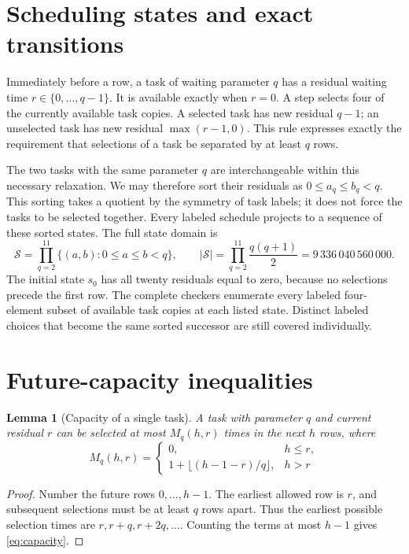 \documentclass[11pt]{article}
\newtheorem{lemma}{Lemma}
\begin{document}
\section{Scheduling states and exact transitions}

Immediately before a row, a task of waiting parameter $q$ has a
residual waiting time $r\in\{0,\ldots,q-1\}$. It is available
exactly when $r=0$. A step selects four of the currently available
task copies. A selected task has new residual $q-1$; an unselected
task has new residual $\max(r-1,0)$. This rule expresses exactly
the requirement that selections of a task be separated by at
least $q$ rows.

The two tasks with the same parameter $q$ are interchangeable
within this necessary relaxation. We may therefore sort their
residuals as $0\leq a_q\leq b_q<q$. This sorting takes a quotient
by the symmetry of task labels; it does not force the tasks to be
selected together. Every labeled schedule projects to a sequence
of these sorted states. The full state domain is
\[
\mathcal S=\prod_{q=2}^{11}\{(a,b):0\leq a\leq b<q\},
\qquad
|\mathcal S|=\prod_{q=2}^{11}\frac{q(q+1)}2
=9\,336\,040\,560\,000.
\]
The initial state $s_0$ has all twenty residuals equal to zero,
because no selections precede the first row. The complete checkers
enumerate every labeled four-element subset of available task
copies at each listed state. Distinct labeled choices that become
the same sorted successor are still covered individually.

\section{Future-capacity inequalities}

\begin{lemma}[Capacity of a single task]\label{lem:capacity}
A task with parameter $q$ and current residual $r$ can be selected
at most $M_q(h,r)$ times in the next $h$ rows, where
\begin{equation*}
M_q(h,r)=
\begin{cases}
0,&h\leq r,\\
1+\lfloor(h-1-r)/q\rfloor,&h>r
\end{cases}
\tag{4}\label{eq:capacity}
\end{equation*}
\end{lemma}

\begin{proof}
Number the future rows $0,\ldots,h-1$. The earliest allowed row is
$r$, and subsequent selections must be at least $q$ rows apart.
Thus the earliest possible selection times are
$r,r+q,r+2q,\ldots$. Counting the terms at most $h-1$ gives
\eqref{eq:capacity}.
\end{proof}
\end{document}
